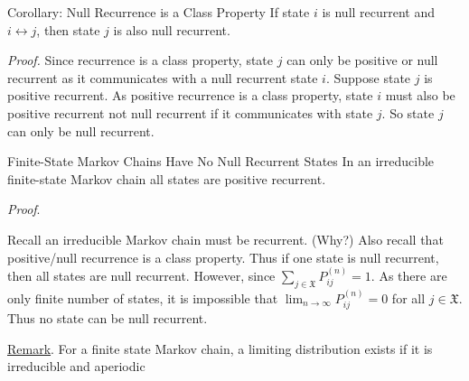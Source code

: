 \documentclass[letterpaper,handout, mathserif]{beamer}
\def\Sum{\sum\nolimits}
\def\X{\mathfrak{X}}
\begin{document}
\begin{frame}{Corollary: Null Recurrence is a Class Property}
If state $i$ is null recurrent and $i\leftrightarrow j$,
then state $j$ is also null recurrent.\smallskip

{\it Proof.} Since recurrence is a class property, state $j$ can only be positive or null recurrent
as it communicates with a null recurrent state $i$.
Suppose state $j$ is positive recurrent.
As positive recurrence is a class property,
state $i$ must also be positive recurrent not null recurrent if it communicates with state $j$.
So state $j$ can only be null recurrent.
 \end{frame}
\begin{frame}{Finite-State Markov Chains Have No Null Recurrent States}
In an irreducible finite-state Markov chain all states are positive recurrent.\smallskip

{\em Proof}. \smallskip


Recall an irreducible Markov chain must be recurrent. (Why?)
Also recall that positive/null recurrence is a class property.
Thus if one state is null recurrent, then all states are null recurrent.
However, since $\Sum_{j\in \X} P^{(n)}_{ij}=1$. As there are only finite number of states,
it is impossible that $\lim_{n\to\infty}P^{(n)}_{ij}=0$ for all $j\in\X$.
Thus no state can be null recurrent.\bigskip


\underline{Remark}. For a finite state Markov chain, a limiting distribution exists if it is irreducible and aperiodic
\end{frame}
\end{document}
